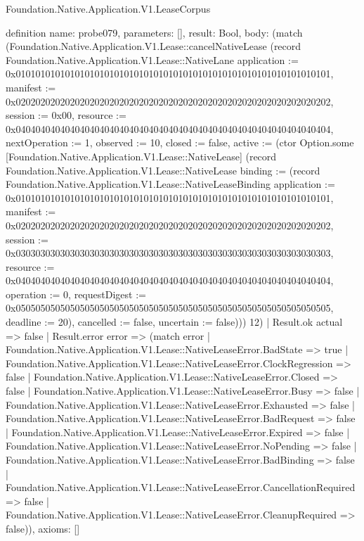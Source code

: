 \begin{lexlean}{Foundation.Native.Application.V1.LeaseCorpus}
\begin{semanticmodule}
definition{
  name: probe079,
  parameters: [],
  result: Bool,
  body: (match (Foundation.Native.Application.V1.Lease::cancelNativeLease (record Foundation.Native.Application.V1.Lease::NativeLane {application := 0x0101010101010101010101010101010101010101010101010101010101010101, manifest := 0x0202020202020202020202020202020202020202020202020202020202020202, session := 0x00, resource := 0x0404040404040404040404040404040404040404040404040404040404040404, nextOperation := 1, observed := 10, closed := false, active := (ctor Option.some [Foundation.Native.Application.V1.Lease::NativeLease] (record Foundation.Native.Application.V1.Lease::NativeLease {binding := (record Foundation.Native.Application.V1.Lease::NativeLeaseBinding {application := 0x0101010101010101010101010101010101010101010101010101010101010101, manifest := 0x0202020202020202020202020202020202020202020202020202020202020202, session := 0x0303030303030303030303030303030303030303030303030303030303030303, resource := 0x0404040404040404040404040404040404040404040404040404040404040404, operation := 0, requestDigest := 0x0505050505050505050505050505050505050505050505050505050505050505, deadline := 20}), cancelled := false, uncertain := false}))}) 12)
    | Result.ok actual => false
    | Result.error error => (match error
      | Foundation.Native.Application.V1.Lease::NativeLeaseError.BadState => true
      | Foundation.Native.Application.V1.Lease::NativeLeaseError.ClockRegression => false
      | Foundation.Native.Application.V1.Lease::NativeLeaseError.Closed => false
      | Foundation.Native.Application.V1.Lease::NativeLeaseError.Busy => false
      | Foundation.Native.Application.V1.Lease::NativeLeaseError.Exhausted => false
      | Foundation.Native.Application.V1.Lease::NativeLeaseError.BadRequest => false
      | Foundation.Native.Application.V1.Lease::NativeLeaseError.Expired => false
      | Foundation.Native.Application.V1.Lease::NativeLeaseError.NoPending => false
      | Foundation.Native.Application.V1.Lease::NativeLeaseError.BadBinding => false
      | Foundation.Native.Application.V1.Lease::NativeLeaseError.CancellationRequired => false
      | Foundation.Native.Application.V1.Lease::NativeLeaseError.CleanupRequired => false)),
  axioms: []
}


\end{semanticmodule}
\end{lexlean}
